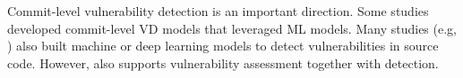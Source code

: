 

\vspace{3pt}
 Commit-level vulnerability
detection is an important direction.  Some
studies~\cite{perl2015vccfinder,zhou2017automated,chen2019large}
developed commit-level VD models that leveraged ML models.  Many
studies (e.g, \cite{li2021vulnerability,
  zhou2019devign,li2021vuldeelocator,li2020automated,chakraborty2021deep,hin2022linevd})
also built machine or deep learning models to detect vulnerabilities
in source code. However, {\tool} also supports vulnerability
assessment together with detection.


